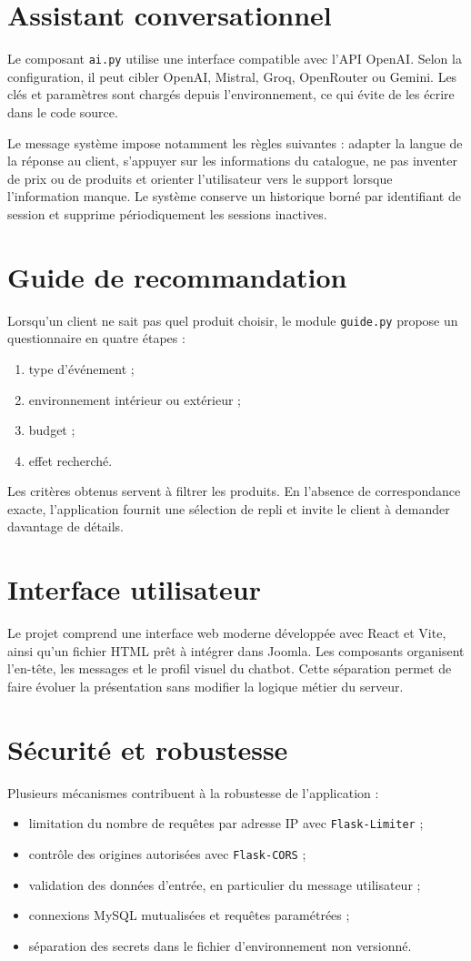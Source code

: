 \documentclass[12pt,a4paper,oneside]{report}
\begin{document}
\section{Assistant conversationnel}
Le composant \texttt{ai.py} utilise une interface compatible avec l'API OpenAI. Selon la configuration, il peut cibler OpenAI, Mistral, Groq, OpenRouter ou Gemini. Les clés et paramètres sont chargés depuis l'environnement, ce qui évite de les écrire dans le code source.

Le message système impose notamment les règles suivantes : adapter la langue de la réponse au client, s'appuyer sur les informations du catalogue, ne pas inventer de prix ou de produits et orienter l'utilisateur vers le support lorsque l'information manque. Le système conserve un historique borné par identifiant de session et supprime périodiquement les sessions inactives.

\section{Guide de recommandation}
Lorsqu'un client ne sait pas quel produit choisir, le module \texttt{guide.py} propose un questionnaire en quatre étapes :
\begin{enumerate}
  \item type d'événement ;
  \item environnement intérieur ou extérieur ;
  \item budget ;
  \item effet recherché.
\end{enumerate}
Les critères obtenus servent à filtrer les produits. En l'absence de correspondance exacte, l'application fournit une sélection de repli et invite le client à demander davantage de détails.

\section{Interface utilisateur}
Le projet comprend une interface web moderne développée avec React et Vite, ainsi qu'un fichier HTML prêt à intégrer dans Joomla. Les composants organisent l'en-tête, les messages et le profil visuel du chatbot. Cette séparation permet de faire évoluer la présentation sans modifier la logique métier du serveur.

\section{Sécurité et robustesse}
Plusieurs mécanismes contribuent à la robustesse de l'application :
\begin{itemize}
  \item limitation du nombre de requêtes par adresse IP avec \texttt{Flask-Limiter} ;
  \item contrôle des origines autorisées avec \texttt{Flask-CORS} ;
  \item validation des données d'entrée, en particulier du message utilisateur ;
  \item connexions MySQL mutualisées et requêtes paramétrées ;
  \item séparation des secrets dans le fichier d'environnement non versionné.
\end{itemize}
\end{document}
